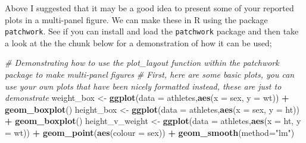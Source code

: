 \documentclass[
]{book}
\newenvironment{Shaded}{\begin{snugshade}}{\end{snugshade}}
\newcommand{\AttributeTok}[1]{\textcolor[rgb]{0.13,0.29,0.53}{#1}}
\newcommand{\CommentTok}[1]{\textcolor[rgb]{0.56,0.35,0.01}{\textit{#1}}}
\newcommand{\FunctionTok}[1]{\textcolor[rgb]{0.13,0.29,0.53}{\textbf{#1}}}
\newcommand{\NormalTok}[1]{#1}
\newcommand{\OtherTok}[1]{\textcolor[rgb]{0.56,0.35,0.01}{#1}}
\newcommand{\SpecialCharTok}[1]{\textcolor[rgb]{0.81,0.36,0.00}{\textbf{#1}}}
\newcommand{\StringTok}[1]{\textcolor[rgb]{0.31,0.60,0.02}{#1}}
\begin{document}
Above I suggested that it may be a good idea to present some of your reported plots in a multi-panel figure. We can make these in R using the package \texttt{patchwork}. See if you can install and load the \texttt{patchwork} package and then take a look at the the chunk below for a demonstration of how it can be used;

\begin{Shaded}
\begin{Highlighting}[]
\CommentTok{\# Demonstrating how to use the plot\_layout function within the patchwork package to make multi{-}panel figures}
\CommentTok{\# First, here are some basic plots, you can use your own plots that have been nicely formatted instead, these are just to demonstrate}
\NormalTok{weight\_box }\OtherTok{\textless{}{-}} \FunctionTok{ggplot}\NormalTok{(}\AttributeTok{data =}\NormalTok{ athletes,}\FunctionTok{aes}\NormalTok{(}\AttributeTok{x =}\NormalTok{ sex, }\AttributeTok{y =}\NormalTok{ wt)) }\SpecialCharTok{+} 
  \FunctionTok{geom\_boxplot}\NormalTok{() }
\NormalTok{height\_box }\OtherTok{\textless{}{-}} \FunctionTok{ggplot}\NormalTok{(}\AttributeTok{data =}\NormalTok{ athletes,}\FunctionTok{aes}\NormalTok{(}\AttributeTok{x =}\NormalTok{ sex, }\AttributeTok{y =}\NormalTok{ ht)) }\SpecialCharTok{+} 
  \FunctionTok{geom\_boxplot}\NormalTok{() }
\NormalTok{height\_v\_weight }\OtherTok{\textless{}{-}} \FunctionTok{ggplot}\NormalTok{(}\AttributeTok{data =}\NormalTok{ athletes,}\FunctionTok{aes}\NormalTok{(}\AttributeTok{x =}\NormalTok{ ht, }\AttributeTok{y =}\NormalTok{ wt)) }\SpecialCharTok{+} 
  \FunctionTok{geom\_point}\NormalTok{(}\FunctionTok{aes}\NormalTok{(}\AttributeTok{colour =}\NormalTok{ sex)) }\SpecialCharTok{+}
  \FunctionTok{geom\_smooth}\NormalTok{(}\AttributeTok{method=}\StringTok{"lm"}\NormalTok{)}


\end{Highlighting}
\end{Shaded}
\end{document}
